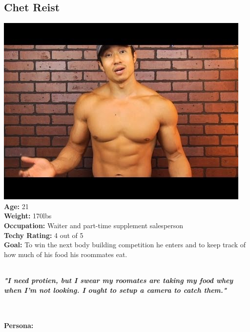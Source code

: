 \documentclass[a4paper,12pt]{article}
\begin{document}
\begin{appendices}
\subsection{Chet Reist}
\includegraphics[scale=0.38]{Chet.jpg}\\
\textbf{Age:} 21\\
\textbf{Weight:} 170lbs\\
\textbf{Occupation:} Waiter and part-time supplement salesperson\\
\textbf{Techy Rating:} 4 out of 5\\
\textbf{Goal:} To win the next body building competition he enters and to keep track of how much of his food his roommates eat.\\
\\
\begin{large}
\textbf{\textit{"I need protien, but I swear my roomates are taking my food whey when I'm not looking.  I ought to setup a camera to catch them."}}
\end{large}\\\\
\textbf{Persona:}
\end{appendices}
\end{document}
